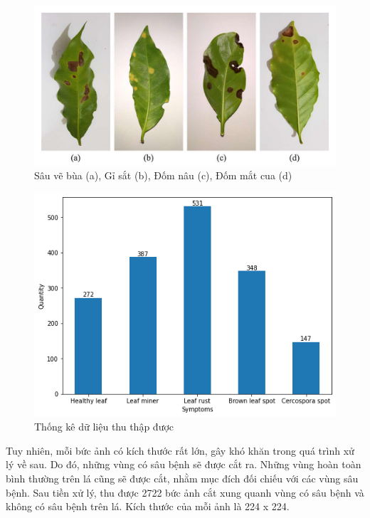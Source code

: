 \documentclass[a4paper,14pt]{extarticle}
\begin{document}
	\begin{figure}[H]
		\centering
		\includegraphics[scale=0.35]{images/image1}
		\caption{Sâu vẽ bùa (a), Gỉ sắt (b), Đốm nâu (c), Đốm mắt cua (d)}
	\end{figure}

	\begin{figure}[H]
		\centering
		\includegraphics[scale=0.6]{images/original_dataset}
		\caption{Thống kê dữ liệu thu thập được}
	\end{figure}

	Tuy nhiên, mỗi bức ảnh có kích thước rất lớn, gây khó khăn trong quá trình xử lý về sau. Do đó, những vùng có sâu bệnh sẽ được cắt ra. Những vùng hoàn toàn bình thường trên lá cũng sẽ được cắt, nhằm mục đích đối chiếu với các vùng sâu bệnh. Sau tiền xử lý, thu được 2722 bức ảnh cắt xung quanh vùng có sâu bệnh và không có sâu bệnh trên lá. Kích thước của mỗi ảnh là 224 x 224.
\end{document}
